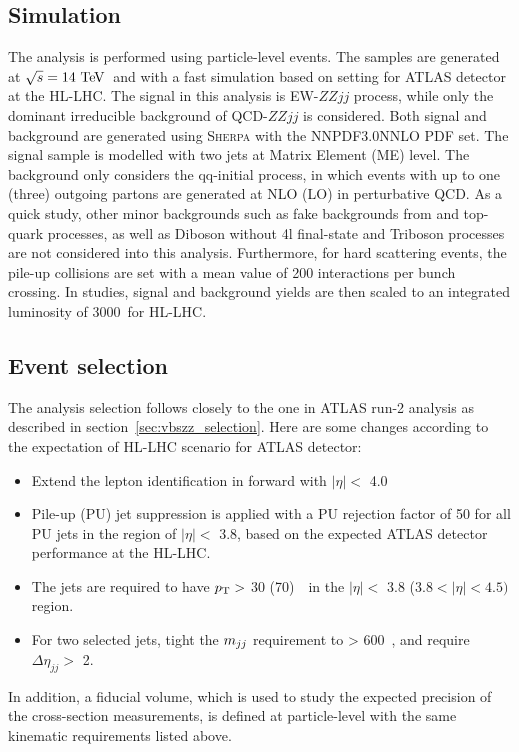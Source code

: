 \subsection{Simulation}

The analysis is performed using particle-level events.
The samples are generated at $\sqrt{s} = 14~\text{Te\kern -0.1em V}$~and with a fast simulation based on setting for ATLAS detector at the HL-LHC.
The signal in this analysis is EW-$ZZjj$ process, while only the dominant irreducible background of QCD-$ZZjj$ is considered.
Both signal and background are generated using \textsc{Sherpa} with the NNPDF3.0NNLO PDF set.
The signal sample is modelled with two jets at Matrix Element (ME) level.
The background only considers the qq-initial process, in which events with up to one (three) outgoing partons are generated at NLO (LO) in perturbative QCD.
As a quick study, other minor backgrounds such as fake backgrounds from \Zjet and top-quark processes, as well as Diboson without 4l final-state and Triboson processes are not considered into this analysis.
Furthermore, for hard scattering events, the pile-up collisions are set with a mean value of 200 interactions per bunch crossing.
In studies, signal and background yields are then scaled to an integrated luminosity of 3000~\ifb for HL-LHC.

\subsection{Event selection}

The analysis selection follows closely to the one in ATLAS run-2 analysis as described in section~\ref{sec:vbszz_selection}.
Here are some changes according to the expectation of HL-LHC scenario for ATLAS detector:
\begin{itemize}
	\item Extend the lepton identification in forward with $|\eta| <$ 4.0
	\item Pile-up (PU) jet suppression is applied with a PU rejection factor of 50 for all PU jets in the region of $|\eta| <$ 3.8, based on the expected ATLAS detector performance at the HL-LHC.
	\item The jets are required to have $p_{\text{T}} >$ 30 (70)~\gev~in the $|\eta| <$ 3.8 ($3.8 < |\eta| < 4.5)$ region.
	\item For two selected jets, tight the $m_{jj}$ requirement to > 600~\gev, and require $\Delta \eta_{jj} >$ 2.
\end{itemize}
In addition, a fiducial volume, which is used to study the expected precision of the cross-section measurements,
 is defined at particle-level with the same kinematic requirements listed above.

